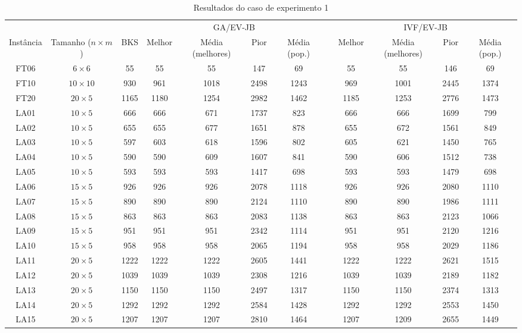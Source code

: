 \begin{sidewaystable}
\caption{Resultados do caso de experimento 1}
\centering
\label{experimento1}
\begin{tabular}{cccccccccccc}
\toprule
& & & \multicolumn{4}{c}{GA/EV-JB} & & \multicolumn{4}{c}{IVF/EV-JB} \\
\cmidrule(c){4-7}
\cmidrule(c){9-12}
Inst\^{a}ncia & Tamanho ($n \times m$) & BKS & Melhor & M\'{e}dia (melhores) & Pior & M\'{e}dia (pop.) & & Melhor & M\'{e}dia (melhores) & Pior & M\'{e}dia (pop.) \\
\midrule
FT06 & $6 \times 6$ & 55 & 55 & 55 & 147 & 69 & & 55 & 55 & 146 & 69 \\
FT10 & $10 \times 10$ & 930 & 961 & 1018 & 2498 & 1243 & & 969 & 1001 & 2445 & 1374 \\
FT20 & $20 \times 5$ & 1165 & 1180 & 1254 & 2982 & 1462 & & 1185 & 1253 & 2776 & 1473 \\
LA01 & $10 \times 5$ & 666 & 666 & 671 & 1737 & 823 & & 666 & 666 & 1699 & 799 \\
LA02 & $10 \times 5$ & 655 & 655 & 677 & 1651 & 878 & & 655 & 672 & 1561 & 849 \\
LA03 & $10 \times 5$ & 597 & 603 & 618 & 1596 & 802 & & 605 & 621 & 1450 & 765 \\
LA04 & $10 \times 5$ & 590 & 590 & 609 & 1607 & 841 & & 590 & 606 & 1512 & 738 \\
LA05 & $10 \times 5$ & 593 & 593 & 593 & 1417 & 698 & & 593 & 593 & 1479 & 698 \\
LA06 & $15 \times 5$ & 926 & 926 & 926 & 2078 & 1118 & & 926 & 926 & 2080 & 1110 \\
LA07 & $15 \times 5$ & 890 & 890 & 890 & 2124 & 1110 & & 890 & 890 & 1986 & 1111 \\
LA08 & $15 \times 5$ & 863 & 863 & 863 & 2083 & 1138 & & 863 & 863 & 2123 & 1066 \\
LA09 & $15 \times 5$ & 951 & 951 & 951 & 2342 & 1114 & & 951 & 951 & 2120 & 1216 \\
LA10 & $15 \times 5$ & 958 & 958 & 958 & 2065 & 1194 & & 958 & 958 & 2029 & 1186 \\
LA11 & $20 \times 5$ & 1222 & 1222 & 1222 & 2605 & 1441 & & 1222 & 1222 & 2621 & 1515 \\
LA12 & $20 \times 5$ & 1039 & 1039 & 1039 & 2308 & 1216 & & 1039 & 1039 & 2189 & 1182 \\
LA13 & $20 \times 5$ & 1150 & 1150 & 1150 & 2497 & 1317 & & 1150 & 1150 & 2374 & 1313 \\
LA14 & $20 \times 5$ & 1292 & 1292 & 1292 & 2584 & 1428 & & 1292 & 1292 & 2553 & 1450 \\
LA15 & $20 \times 5$ & 1207 & 1207 & 1207 & 2810 & 1464 & & 1207 & 1209 & 2655 & 1449 \\
\bottomrule
\end{tabular}
\end{sidewaystable}
